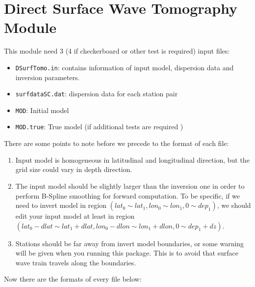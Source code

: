 \documentclass[UTF8]{article}
\begin{document}
     \section{Direct Surface Wave Tomography Module}
     This module need 3 (4 if checkerboard or other test is required) input files:
     \begin{itemize}
        \item \verb!DSurfTomo.in!: contains information of input model, dispersion data and inversion parameters.
        \item \verb!surfdataSC.dat!: dispersion data for each station pair
        \item \verb!MOD!: Initial model
        \item \verb!MOD.true!: True model (if additional tests are required )
    \end{itemize}
    There are some points to note before we precede to the format of each file:
    \begin{enumerate}[(1)]
         \item Input model is homogeneous in latitudinal and longitudinal direction, but 
                the grid size could vary in depth direction.
        \item The input model should be slightly larger than the inversion one in order to 
              perform B-Spline smoothing for forward computation. To be specific,
              if we need to invert model in region $(lat_0 \sim lat_1,lon_0\sim lon_1,0\sim dep_1)$, 
              we should edit your input model at least in region $(lat_0-dlat \sim lat_1+dlat, lon_0-dlon \sim lon_1+dlon,0 \sim dep_1+dz)$.
         \item Stations should be far away from invert model boundaries, or some warning will be given 
              when you running this package. This is to avoid that surface wave train travels 
                along the boundaries.
    \end{enumerate}
    Now there are the formats of every file below:
\end{document}
